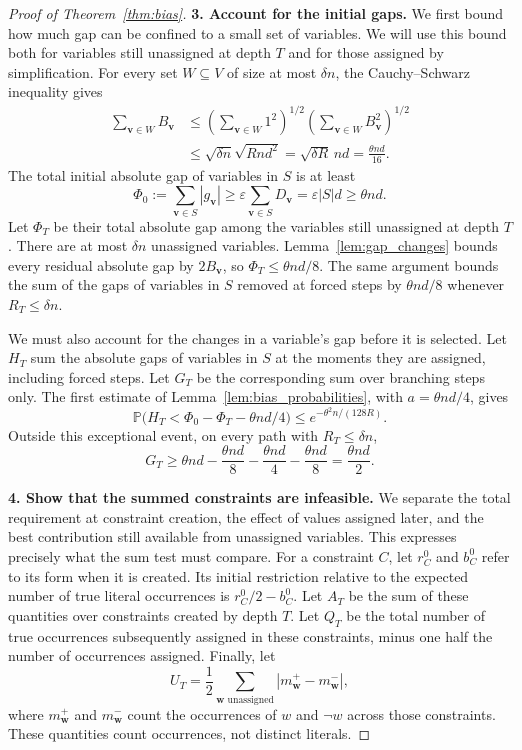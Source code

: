 \documentclass[11pt,a4paper]{article}
\theoremstyle{definition}
\theoremstyle{remark}
\newcommand{\Prb}{\mathbb P}
\begin{document}
\begin{proof}[Proof of Theorem~\ref{thm:bias}]
\par\medskip\noindent\textbf{3. Account for the initial gaps.} 
We first bound how much gap can be confined to a small set of variables.
We will use this bound both for variables still unassigned at depth $T$
and for those assigned by simplification.
For every set $W\subseteq V$ of size at most $\delta n$, the
Cauchy--Schwarz inequality gives
\begin{align*}
 \sum_{\mathbf v\in W}B_{\mathbf v}
 &\le \left(\sum_{\mathbf v\in W}1^2\right)^{1/2}
       \left(\sum_{\mathbf v\in W}B_{\mathbf v}^2\right)^{1/2}\\
 &\le\sqrt{\delta n}\sqrt{Rnd^2}
   =\sqrt{\delta R}\,nd=\frac{\theta nd}{16}.
\end{align*}
The total initial absolute gap of variables in $S$ is at least
\[
 \Phi_0:=\sum_{\mathbf v\in S}|g_{\mathbf v}|
 \ge\varepsilon\sum_{\mathbf v\in S}D_{\mathbf v}
 =\varepsilon|S|d\ge\theta nd.
\]
Let $\Phi_T$ be their total absolute gap among the variables still
unassigned at depth $T$. There are at most $\delta n$ unassigned variables.
Lemma~\ref{lem:gap_changes} bounds every residual absolute gap by
$2B_{\mathbf v}$, so $\Phi_T\le\theta nd/8$.
The same argument bounds the sum of the gaps of variables in $S$ removed
at forced steps by $\theta nd/8$ whenever $R_T\le\delta n$.

We must also account for the changes in a variable's gap before it is
selected. Let $H_T$ sum the absolute gaps of variables in $S$ at the moments they
are assigned, including forced steps. Let $G_T$ be the corresponding sum
over branching steps only. The first estimate of
Lemma~\ref{lem:bias_probabilities}, with $a=\theta nd/4$, gives
\[
 \Prb\bigl(H_T<\Phi_0-\Phi_T-\theta nd/4\bigr)
 \le e^{-\theta^2n/(128R)}.
\]
Outside this exceptional event, on every path with $R_T\le\delta n$,
\[
 G_T\ge \theta nd-\frac{\theta nd}{8}
                    -\frac{\theta nd}{4}-\frac{\theta nd}{8}
      =\frac{\theta nd}{2}.
\]

\par\medskip\noindent\textbf{4. Show that the summed constraints are infeasible.} 
We separate the total requirement at constraint creation, the effect of
values assigned later, and the best contribution still available from
unassigned variables. This expresses precisely what the sum test must
compare.
For a constraint $C$, let $r_C^0$ and $b_C^0$ refer to its form when it is
created. Its initial restriction relative to the expected number of true
literal occurrences is $r_C^0/2-b_C^0$.
Let $A_T$ be the sum of these quantities over constraints created by depth
$T$. Let $Q_T$ be the total number of true occurrences subsequently assigned
in these constraints, minus one half the number of occurrences assigned.
Finally, let
\[
 U_T=\frac12\sum_{\mathbf w\text{ unassigned}}
             |m_{\mathbf w}^+-m_{\mathbf w}^-|,
\]
where $m_{\mathbf w}^+$ and $m_{\mathbf w}^-$ count the occurrences of $w$
and $\neg w$ across those constraints. These quantities count occurrences,
not distinct literals.


\end{proof}
\end{document}
